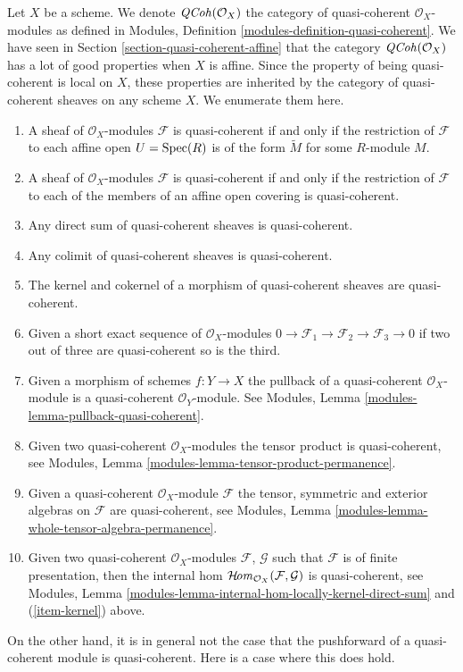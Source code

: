 \noindent
Let $X$ be a scheme. We denote $\mathit{QCoh}(\mathcal{O}_X)$ the
category of quasi-coherent $\mathcal{O}_X$-modules as defined in
Modules, Definition \ref{modules-definition-quasi-coherent}.
We have seen in
Section \ref{section-quasi-coherent-affine}
that the category $\mathit{QCoh}(\mathcal{O}_X)$ has a lot of good properties
when $X$ is affine. Since the property of being quasi-coherent is
local on $X$, these properties are inherited by the category
of quasi-coherent sheaves on any scheme $X$. We enumerate them here.
\begin{enumerate}
\item A sheaf of $\mathcal{O}_X$-modules $\mathcal{F}$ is
quasi-coherent if and only if the restriction of $\mathcal{F}$
to each affine open $U = \mathop{\mathrm{Spec}}(R)$ is of the form
$\widetilde M$ for some $R$-module $M$.
\item A sheaf of $\mathcal{O}_X$-modules $\mathcal{F}$ is
quasi-coherent if and only if the restriction of $\mathcal{F}$
to each of the members of an affine open covering is quasi-coherent.
\item Any direct sum of quasi-coherent sheaves is quasi-coherent.
\item Any colimit of quasi-coherent sheaves is quasi-coherent.
\item
\label{item-kernel}
The kernel and cokernel of a morphism of quasi-coherent sheaves
are quasi-coherent.
\item Given a short exact sequence of $\mathcal{O}_X$-modules
$0 \to \mathcal{F}_1 \to \mathcal{F}_2 \to \mathcal{F}_3 \to 0$
if two out of three are quasi-coherent so is the third.
\item Given a morphism of schemes $f : Y \to X$ the pullback
of a quasi-coherent $\mathcal{O}_X$-module is a quasi-coherent
$\mathcal{O}_Y$-module. See
Modules, Lemma \ref{modules-lemma-pullback-quasi-coherent}.
\item Given two quasi-coherent $\mathcal{O}_X$-modules
the tensor product is quasi-coherent, see
Modules, Lemma \ref{modules-lemma-tensor-product-permanence}.
\item Given a quasi-coherent $\mathcal{O}_X$-module $\mathcal{F}$
the tensor, symmetric and exterior algebras on $\mathcal{F}$
are quasi-coherent, see
Modules, Lemma \ref{modules-lemma-whole-tensor-algebra-permanence}.
\item Given two quasi-coherent $\mathcal{O}_X$-modules
$\mathcal{F}$, $\mathcal{G}$ such that $\mathcal{F}$
is of finite presentation, then the internal hom
$\mathop{\mathcal{H}\!\mathit{om}}\nolimits_{\mathcal{O}_X}(\mathcal{F}, \mathcal{G})$
is quasi-coherent, see
Modules, Lemma \ref{modules-lemma-internal-hom-locally-kernel-direct-sum}
and (\ref{item-kernel}) above.
\end{enumerate}
On the other hand, it is in general not the case that the
pushforward of a quasi-coherent module is quasi-coherent.
Here is a case where this does hold.

